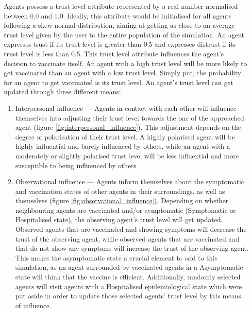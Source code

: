 Agents possess a trust level attribute represented by a real number normalised between 0.0 and 1.0. Ideally, this attribute would be initialised for all agents following a skew normal distribution, aiming at getting as close to an average trust level given by the user to the entire population of the simulation.
An agent expresses trust if its trust level is greater than 0.5 and expresses distrust if its trust level is less than 0.5.
This trust level attribute influences the agent's decision to vaccinate itself. An agent with a high trust level will be more likely to get vaccinated than an agent with a low trust level. Simply put, the probability for an agent to get vaccinated is its trust level. An agent's trust level can get updated through three different means:
\begin{enumerate}
    \item Interpersonal influence --- Agents in contact with each other will influence themselves into adjusting their trust level towards the one of the approached agent (figure \ref{fig:interpersonal_influence}). This adjustment depends on the degree of polarisation of their trust level. A highly polarised agent will be highly influential and barely influenced by others, while an agent with a moderately or slightly polarised trust level will be less influential and more susceptible to being influenced by others.

    \item Observational influence --- Agents inform themselves about the symptomatic and vaccination states of other agents in their surroundings, as well as themselves (figure \ref{fig:observational_influence}). Depending on whether neighbouring agents are vaccinated and/or symptomatic (Symptomatic or Hospitalised state), the observing agent's trust level will get updated. Observed agents that are vaccinated and showing symptoms will decrease the trust of the observing agent, while observed agents that are vaccinated and that do not show any symptoms will increase the trust of the observing agent. This makes the asymptomatic state a crucial element to add to this simulation, as an agent surrounded by vaccinated agents in a Asymptomatic state will think that the vaccine is efficient. Additionally, randomly selected agents will visit agents with a Hospitalised epidemiological state which were put aside in order to update those selected agents' trust level by this means of influence.


\end{enumerate}
